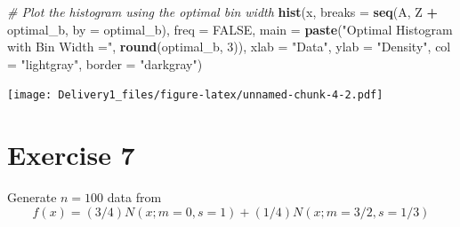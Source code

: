 \documentclass[
]{article}
\newenvironment{Shaded}{\begin{snugshade}}{\end{snugshade}}
\newcommand{\AttributeTok}[1]{\textcolor[rgb]{0.13,0.29,0.53}{#1}}
\newcommand{\CommentTok}[1]{\textcolor[rgb]{0.56,0.35,0.01}{\textit{#1}}}
\newcommand{\ConstantTok}[1]{\textcolor[rgb]{0.56,0.35,0.01}{#1}}
\newcommand{\DecValTok}[1]{\textcolor[rgb]{0.00,0.00,0.81}{#1}}
\newcommand{\FunctionTok}[1]{\textcolor[rgb]{0.13,0.29,0.53}{\textbf{#1}}}
\newcommand{\NormalTok}[1]{#1}
\newcommand{\SpecialCharTok}[1]{\textcolor[rgb]{0.81,0.36,0.00}{\textbf{#1}}}
\newcommand{\StringTok}[1]{\textcolor[rgb]{0.31,0.60,0.02}{#1}}
\begin{document}
\begin{Shaded}
\begin{Highlighting}[]
\CommentTok{\# Plot the histogram using the optimal bin width}
\FunctionTok{hist}\NormalTok{(x, }\AttributeTok{breaks =} \FunctionTok{seq}\NormalTok{(A, Z }\SpecialCharTok{+}\NormalTok{ optimal\_b, }\AttributeTok{by =}\NormalTok{ optimal\_b), }\AttributeTok{freq =} \ConstantTok{FALSE}\NormalTok{, }
     \AttributeTok{main =} \FunctionTok{paste}\NormalTok{(}\StringTok{"Optimal Histogram with Bin Width ="}\NormalTok{, }\FunctionTok{round}\NormalTok{(optimal\_b, }\DecValTok{3}\NormalTok{)), }
     \AttributeTok{xlab =} \StringTok{"Data"}\NormalTok{, }\AttributeTok{ylab =} \StringTok{"Density"}\NormalTok{, }\AttributeTok{col =} \StringTok{"lightgray"}\NormalTok{, }\AttributeTok{border =} \StringTok{"darkgray"}\NormalTok{)}
\end{Highlighting}
\end{Shaded}

\texttt{[image: Delivery1\_files/figure-latex/unnamed-chunk-4-2.pdf]}

\section{Exercise 7}\label{exercise-7}

Generate \(n=100\) data from \[
f(x) = (3/4)N(x; m = 0, s = 1) +(1/4) N(x; m = 3/2, s = 1/3)\]
\end{document}
